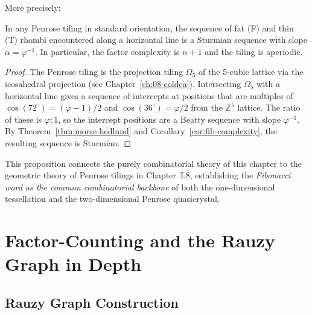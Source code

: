 More precisely:

\begin{proposition}%
  \label{prop:fib-penrose}
  In any Penrose tiling in standard orientation, the sequence of
  fat (F) and thin (T) rhombi encountered along a horizontal line
  is a Sturmian sequence with slope \(\alpha=\varphi^{-1}\).
  In particular, the factor complexity is \(n+1\) and the tiling is
  aperiodic.
\end{proposition}
\begin{proof}
  The Penrose tiling is the projection tiling \(\Omega_5\) of the
  5-cubic lattice via the icosahedral projection (see
  Chapter~\ref{ch:08-coldea}).  Intersecting \(\Omega_5\) with a
  horizontal line gives a sequence of intercepts at positions that
  are multiples of \(\cos(72^\circ)=(\varphi-1)/2\) and
  \(\cos(36^\circ)=\varphi/2\) from the \(\mathbb{Z}^5\) lattice.
  The ratio of these is \(\varphi:1\), so the intercept positions
  are a Beatty sequence with slope \(\varphi^{-1}\).  By
  Theorem~\ref{thm:morse-hedlund} and Corollary~\ref{cor:fib-complexity},
  the resulting sequence is Sturmian.
\end{proof}

This proposition connects the purely combinatorial theory of this
chapter to the geometric theory of Penrose tilings in Chapter~L8,
establishing the \emph{Fibonacci word as the common combinatorial
backbone} of both the one-dimensional tessellation and the
two-dimensional Penrose quasicrystal.

\section{Factor-Counting and the Rauzy Graph in Depth}
\label{sec:ch19-rauzy-depth}

\subsection{Rauzy Graph Construction}
\label{subsec:ch19-rauzy-graph}

